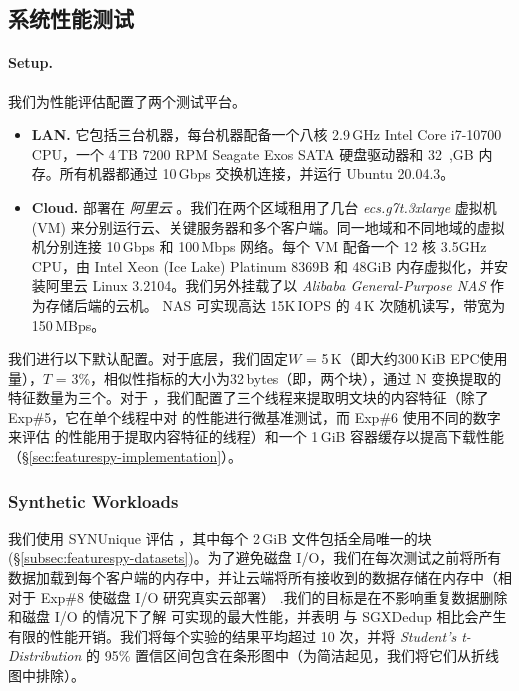 \subsection{系统性能测试}
\label{subsec:featurespy-evaluation-performance}


\paragraph*{Setup.} 我们为性能评估配置了两个测试平台。

\begin{itemize}[leftmargin=*]
\item {\bf LAN.} 它包括三台机器，每台机器配备一个八核 2.9\,GHz Intel Core i7-10700 CPU，一个 4\,TB 7200 RPM Seagate Exos SATA 硬盘驱动器和 32\ ,GB 内存。所有机器都通过 10\,Gbps 交换机连接，并运行 Ubuntu 20.04.3。

\item {\bf Cloud.} 部署在 {\em 阿里云} \cite{alibaba}。我们在两个区域租用了几台 {\em ecs.g7t.3xlarge} 虚拟机 (VM) 来分别运行云、关键服务器和多个客户端。同一地域和不同地域的虚拟机分别连接 10\,Gbps 和 100\,Mbps 网络。每个 VM 配备一个 12 核 3.5GHz CPU，由 Intel Xeon (Ice Lake) Platinum 8369B 和 48GiB 内存虚拟化，并安装阿里云 Linux 3.2104。我们另外挂载了以 {\em Alibaba General-Purpose NAS} 作为存储后端的云机。 NAS 可实现高达 15K\,IOPS 的 4\,K 次随机读写，带宽为 150\,MBps。
\end{itemize}

我们进行以下默认配置。对于底层\sysnameF，我们固定$W$ = 5\,K（即大约300\,KiB EPC使用量），$T$ = 3\%，相似性指标的大小为32\,bytes（即，两个块），通过 N 变换提取的特征数量为三个。对于 \prototype，我们配置了三个线程来提取明文块的内容特征（除了 Exp\#5，它在单个线程中对 \prototype 的性能进行微基准测试，而 Exp\#6 使用不同的数字来评估 \prototype 的性能用于提取内容特征的线程）和一个 1\,GiB 容器缓存以提高下载性能（\S\ref{sec:featurespy-implementation}）。

\subsubsection{Synthetic Workloads}
\label{subsec:featurespy-syn}
我们使用 SYNUnique 评估 \prototype，其中每个 2\,GiB 文件包括全局唯一的块 (\S\ref{subsec:featurespy-datasets})。为了避免磁盘 I/O，我们在每次测试之前将所有数据加载到每个客户端的内存中，并让云端将所有接收到的数据存储在内存中（相对于 Exp\#8 使磁盘 I/O 研究真实云部署） .我们的目标是在不影响重复数据删除和磁盘 I/O 的情况下了解 \prototype 可实现的最大性能，并表明 \prototype 与 SGXDedup \cite{ren21} 相比会产生有限的性能开销。我们将每个实验的结果平均超过 10 次，并将 {\em Student's t-Distribution} 的 95\% 置信区间包含在条形图中（为简洁起见，我们将它们从折线图中排除）。

